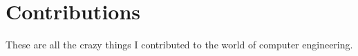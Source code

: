 \section{Contributions}

These are all the crazy things I contributed to the world of computer engineering.